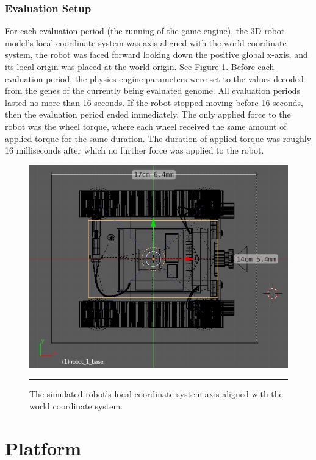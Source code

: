 \subsubsection{Evaluation Setup}

For each evaluation period (the running of the game engine), the 3D robot model's local coordinate system was axis aligned with the world coordinate system, the robot was faced forward looking down the positive global x-axis, and its local origin was placed at the world origin. See Figure \ref{fig:simu_robot_aligned}. Before each evaluation period, the physics engine parameters were set to the values decoded from the genes of the currently being evaluated genome. All evaluation periods lasted no more than 16 seconds. If the robot stopped moving before 16 seconds, then the evaluation period ended immediately. The only applied force to the robot was the wheel torque, where each wheel received the same amount of applied torque for the same duration. The duration of applied torque was roughly 16 milliseconds after which no further force was applied to the robot.

\begin{figure}[htbp]
\centering
\includegraphics[scale=0.5]{../Figures/Chapter4/simu_robot_aligned.png}
\rule{35em}{0.5pt}
\caption[Simulated Robot Axis Aligned]{The simulated robot's local coordinate system axis aligned with the world coordinate system.}
\label{fig:simu_robot_aligned}
\end{figure}

\section{Platform}

